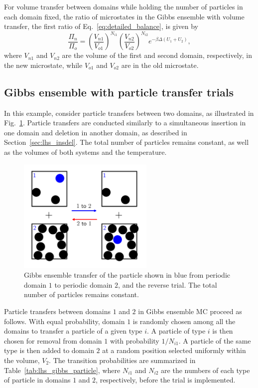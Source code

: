 \documentclass[
  9pt,
  bestpractices,
]{livecoms}
\begin{document}
For volume transfer between domains while holding the number of particles in each domain fixed, the ratio of microstates in the Gibbs ensemble with volume transfer, the first ratio of Eq.~\ref{eq:detailed_balance}, is given by
\begin{equation}
\frac{\Pi_{n}}{\Pi_{o}} = \left(\frac{V_{n1}}{V_{o1}}\right)^{N_{i1}}\left(\frac{V_{n2}}{V_{o2}}\right)^{N_{i2}}e^{-\beta\Delta (U_1+U_2)},
\label{eq:rhs_gibbs_volume}
\end{equation}
where $V_{n1}$ and $V_{n2}$ are the volume of the first and second domain, respectively, in the new microstate, while $V_{o1}$ and $V_{o2}$ are in the old microstate.

\subsection{\label{sec:lhs_gibbs_particle}Gibbs ensemble with particle transfer trials}

In this example, consider particle transfers between two domains, as illustrated in Fig.~\ref{fig:gibbs_particle}.
Particle transfers are conducted similarly to a simultaneous insertion in one domain and deletion in another domain, as described in Section~\ref{sec:lhs_insdel}.
The total number of particles remains constant, as well as the volumes of both systems and the temperature.

\begin{figure}
\begin{centering}
\includegraphics[width=6.5cm]{../figures/gibbs_particle.png}
\caption{
Gibbs ensemble transfer of the particle shown in blue from periodic domain $1$ to periodic domain $2$, and the reverse trial.
The total number of particles remains constant.
}
\label{fig:gibbs_particle}
\end{centering}
\end{figure}

Particle transfers between domains $1$ and $2$ in Gibbs ensemble MC proceed as follows.
With equal probability, domain $1$ is randomly chosen among all the domains to transfer a particle of a given type $i$.
A particle of type $i$ is then chosen for removal from domain $1$ with probability $1/N_{i1}$.
A particle of the same type is then added to domain $2$ at a random position selected uniformly within the volume, $V_2$.
The transition probabilities are summarized in Table~\ref{tab:lhs_gibbs_particle}, where $N_{i1}$ and $N_{i2}$ are the numbers of each type of particle in domains $1$ and $2$, respectively, before the trial is implemented.
\end{document}
